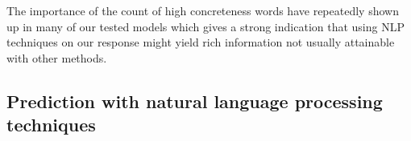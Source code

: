 \documentclass[12pt, a4paper]{article}
\begin{document}
The importance of the count of high concreteness words have repeatedly shown up in many of our tested models which gives a strong indication that using NLP techniques on our response might yield rich information not usually attainable with other methods.

\subsection{Prediction with natural language processing techniques}

\end{document}
